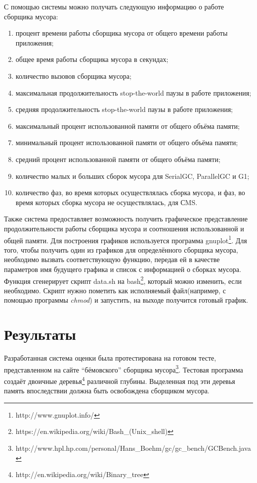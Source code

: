 \documentclass[12pt,a4paper]{article}
\begin{document}
С помощью системы можно получать следующую информацию о работе сборщика мусора:
\begin{enumerate}
\item процент времени работы сборщика мусора от общего времени работы приложения;
\item общее время работы сборщика мусора в секундах;
\item количество вызовов сборщика мусора;
\item максимальная продолжительность stop-the-world паузы в работе приложения;
\item средняя продолжительность stop-the-world паузы в работе приложения;
\item максимальный процент использованной памяти от общего объёма памяти;
\item минимальный процент использованной памяти от общего объёма памяти;
\item средний процент использованной памяти от общего объёма памяти;
\item количество малых и больших сборок мусора для SerialGC, ParallelGC и G1;
\item количество фаз, во время которых осуществлялась сборка мусора, и фаз, во время
которых сборка мусора не осуществлялась, для СMS.
\end{enumerate}


Также система предоставляет возможность получить графическое представление
продолжительности работы сборщика мусора и соотношения использованной и общей 
памяти. Для построения графиков
используется программа gnuplot\footnote{http://www.gnuplot.info/}.
Для того, чтобы получить один из графиков для определённого сборщика 
мусора, необходимо вызвать соответствующую функцию, передав ей в качестве параметров
имя будущего графика и список с информацией о сборках мусора. Функция
сгенерирует скрипт data.sh на bash\footnote{https://en.wikipedia.org/wiki/Bash\_(Unix\_shell)}, который можно изменить, если необходимо.
Скрипт нужно пометить как исполняемый файл(например,
с помощью программы \textit{chmod}) и запустить, на выходе получится готовый график.

\newpage
\section{Результаты}
Разработанная система оценки была протестирована на готовом тесте, представленном 
на сайте ``бёмовского'' сборщика мусора\footnote{http://www.hpl.hp.com/personal/Hans\_Boehm/gc/gc\_bench/GCBench.java}.
Тестовая программа создаёт двоичные деревья\footnote{http://en.wikipedia.org/wiki/Binary\_tree}
различной глубины. Выделенная под эти деревья память впоследствии должна быть освобождена сборщиком мусора.
\end{document}
